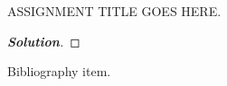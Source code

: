 \documentclass[11pt]{article}
\newenvironment{soln}
{\let\oldqedsymbol=\qedsymbol
	\renewcommand{\qedsymbol}{$ $}
	\begin{proof}[\bfseries\upshape \color{blue}Solution]\color{blue}}
	{\end{proof}
	\renewcommand{\qedsymbol}{\oldqedsymbol}}
\begin{document}
 

\begin{center}
	{\Large ASSIGNMENT TITLE GOES HERE.}
\end{center}

\lipsum[1-2]

\begin{soln}
	\lipsum[2-3]
\end{soln}

\begin{thebibliography}{9}
	 Bibliography item.
\end{thebibliography}

\end{document}
